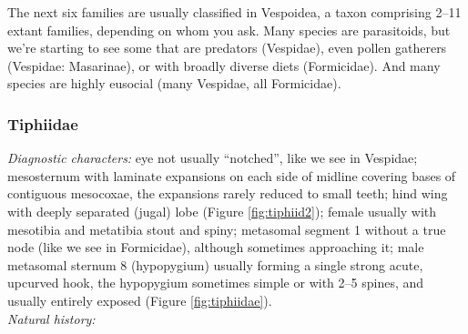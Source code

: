 \documentclass[letterpaper, 11pt]{article}
\begin{document}
\noindent{}The next six families are usually classified in Vespoidea, a taxon comprising 2--11 extant families, depending on whom you ask. Many species are parasitoids, but we're starting to see some that are predators (Vespidae), even pollen gatherers (Vespidae: Masarinae), or with broadly diverse diets (Formicidae). And many species are highly eusocial (many Vespidae, all Formicidae). 

\subsubsection{Tiphiidae}
\noindent{}\textit{Diagnostic characters:} eye not usually ``notched'', like we see in Vespidae; mesosternum with laminate expansions on each side of midline covering bases of contiguous mesocoxae, the expansions rarely reduced to small teeth; hind wing with deeply separated (jugal) lobe (Figure \ref{fig:tiphiid2}); female usually with mesotibia and metatibia stout and spiny; metasomal segment 1 without a true node (like we see in Formicidae), although sometimes approaching it; male metasomal sternum 8 (hypopygium) usually forming a single strong acute, upcurved hook, the hypopygium sometimes simple or with 2--5 spines, and usually entirely exposed (Figure \ref{fig:tiphiidae}).\\

\noindent{}\textit{Natural history:} \\
\end{document}
